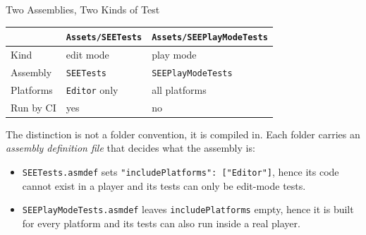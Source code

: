 \begin{frame}{Two Assemblies, Two Kinds of Test}
  \begin{center}
    \footnotesize
    \begin{tabular}{lll}
      \hline
      & \textbf{\texttt{Assets/SEETests}} & \textbf{\texttt{Assets/SEEPlayModeTests}}\\
      \hline
      Kind          & edit mode             & play mode\\
      Assembly      & \texttt{SEETests}     & \texttt{SEEPlayModeTests}\\
      Platforms     & \texttt{Editor} only  & all platforms\\
      Run by CI     & yes                   & no\\
      \hline
    \end{tabular}
  \end{center}
  \vspace{2ex}

  The distinction is not a folder convention, it is compiled in. Each folder
  carries an \emph{assembly definition file} that decides what the assembly is:
  \vspace{1ex}

  \begin{itemize}
    \item \texttt{SEETests.asmdef} sets \texttt{"includePlatforms": ["Editor"]},
      hence its code cannot exist in a player and its tests can only be edit-mode tests.
    \item \texttt{SEEPlayModeTests.asmdef} leaves \texttt{includePlatforms}
      empty, hence it is built for every platform and its tests can also run
      inside a real player.
  \end{itemize}
\end{frame}


